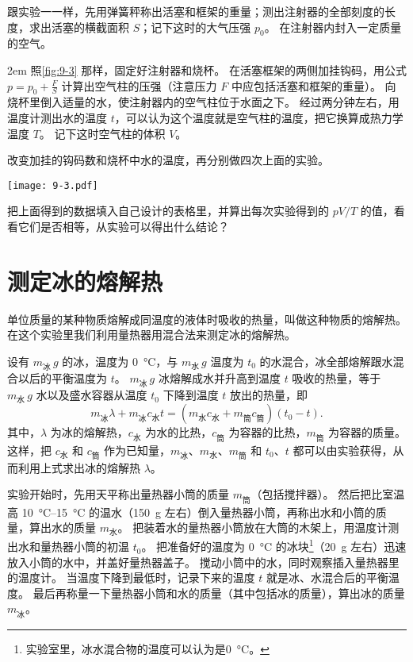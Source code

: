 跟实验一一样，先用弹簧秤称出活塞和框架的重量；测出注射器的全部刻度的长度，求出活塞的横截面积 $S$；记下这时的大气压强 $p_0$。
在注射器内封入一定质量的空气。

\medskip\noindent
\begin{minipage}{0.7\linewidth}\parindent2em
照\cref{fig:9-3} 那样，固定好注射器和烧杯。
在活塞框架的两侧加挂钩码，用公式 $p=p_0+ \frac{F}{S}$ 计算出空气柱的压强（注意压力 $F$ 中应包括活塞和框架的重量）。
向烧杯里倒入适量的水，使注射器内的空气柱位于水面之下。
经过两分钟左右，用温度计测出水的温度 $t$，可以认为这个温度就是空气柱的温度，把它换算成热力学温度 $T$。
记下这时空气柱的体积 $V$。

改变加挂的钩码数和烧杯中水的温度，再分别做四次上面的实验。
\end{minipage}\hfill
\begin{minipage}{0.25\linewidth}\centering
  \begin{figurehere}
    \texttt{[image: 9-3.pdf]}
    \caption{}\label{fig:9-3}
  \end{figurehere}
\end{minipage}

\medskip
把上面得到的数据填入自己设计的表格里，并算出每次实验得到的 $pV/T$ 的值，看看它们是否相等，从实验可以得出什么结论？

\section{测定冰的熔解热}

单位质量的某种物质熔解成同温度的液体时吸收的热量，叫做这种物质的熔解热。
在这个实验里我们利用量热器用混合法来测定冰的熔解热。

设有 $m_{\text{冰}}\,\unit{g}$ 的冰，温度为 \qty{0}{\celsius}，与 $m_{\text{水}}\,\unit{g}$ 温度为 $t_0$ 的水混合，冰全部熔解跟水混合以后的平衡温度为 $t$。
$m_{\text{冰}}\,\unit{g}$ 冰熔解成水并升高到温度 $t$ 吸收的热量，等于 $m_{\text{水}}\,\unit{g}$ 水以及盛水容器从温度 $t_0$ 下降到温度 $t$ 放出的热量，即
\[ m_{\text{冰}}\lambda+m_{\text{冰}}c_{\text{水}}t=(m_{\text{水}}c_{\text{水}}+m_{\text{筒}}c_{\text{筒}})(t_0-t).\]
其中，$\lambda$ 为冰的熔解热，$c_{\text{水}}$ 为水的比热，$c_{\text{筒}}$ 为容器的比热，$m_{\text{筒}}$ 为容器的质量。
这样，把 $c_{\text{水}}$ 和 $c_{\text{筒}}$ 作为已知量，$m_{\text{冰}}$、$m_{\text{水}}$、$m_{\text{筒}}$ 和 $t_0$、$t$ 都可以由实验获得，从而利用上式求出冰的熔解热 $\lambda$。

实验开始时，先用天平称出量热器小筒的质量 $m_{\text{筒}}$（包括搅拌器）。
然后把比室温高 \qtyrange{10}{15}{\celsius} 的温水（\qty{150}{g} 左右）倒入量热器小筒，再称出水和小筒的质量，算出水的质量 $m_{\text{水}}$。
把装着水的量热器小筒放在大筒的木架上，用温度计测出水和量热器小筒的初温 $t_0$。
把准备好的温度为 \qty{0}{\celsius} 的冰块\footnote{实验室里，冰水混合物的温度可以认为是\qty{0}{\celsius}。}（\qty{20}{g} 左右）迅速放入小筒的水中，并盖好量热器盖子。
搅动小筒中的水，同时观察插入量热器里的温度计。
当温度下降到最低时，记录下来的温度 $t$ 就是冰、水混合后的平衡温度。
最后再称量一下量热器小筒和水的质量（其中包括冰的质量），算出冰的质量 $m_{\text{冰}}$。

